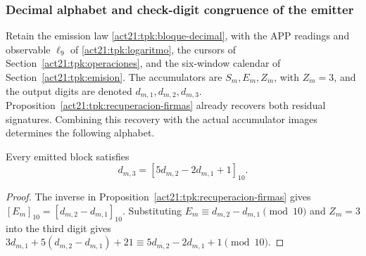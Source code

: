 \subsubsection{Decimal alphabet and check-digit congruence of the emitter}
\label{sec:rec27-codigo}

Retain the emission law \eqref{act21:tpk:bloque-decimal},
with the APP readings and observable \(\ell_9\) of
\eqref{act21:tpk:logaritmo}, the cursors of
Section~\ref{act21:tpk:operaciones}, and the six-window calendar of
Section~\ref{act21:tpk:emision}. The accumulators are \(S_m,E_m,Z_m\),
with \(Z_m=3\), and the output digits are denoted
\(d_{m,1},d_{m,2},d_{m,3}\).
Proposition~\ref{act21:tpk:recuperacion-firmas} already recovers both
residual signatures. Combining this recovery with the actual accumulator
images determines the following alphabet.

\begin{proposition}
Every emitted block satisfies
\[
 d_{m,3}=[5d_{m,2}-2d_{m,1}+1]_{10}.
\]
\end{proposition}
\begin{proof}
The inverse in Proposition~\ref{act21:tpk:recuperacion-firmas}
gives \([E_m]_{10}=[d_{m,2}-d_{m,1}]_{10}\). Substituting
$E_m\equiv d_{m,2}-d_{m,1}\pmod{10}$ and $Z_m=3$ into the third digit gives
$3d_{m,1}+5(d_{m,2}-d_{m,1})+21\equiv5d_{m,2}-2d_{m,1}+1\pmod{10}$.
\end{proof}

